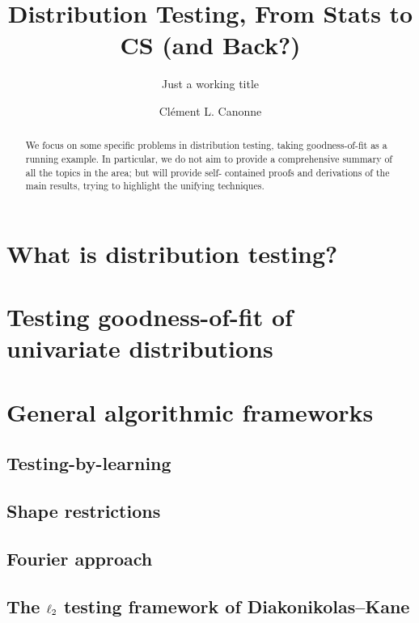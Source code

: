 \documentclass[biber,draft]{nowfnt} %
\title{Distribution Testing, From Stats to CS (and Back?)}
\subtitle{Just a working title}
\author[1]{Cl\'ement L. Canonne}
\affil[1]{University of Sydney; clement.canonne@sydney.edu.au}
\begin{document}
\makeabstracttitle
\begin{abstract}
We focus on some specific problems in distribution testing,
taking goodness-of-fit as a running example. In particular,
we do not aim to provide a comprehensive summary of all
the topics in the area; but will provide self-
contained proofs and derivations of the main results, trying
to highlight the unifying techniques.
\end{abstract}

\chapter{What is distribution testing?}



\chapter{Testing goodness-of-fit of univariate distributions}
  \label{chap:identity}




\chapter{General algorithmic frameworks}
  \label{chap:algorithmic:frameworks}
\section{Testing-by-learning}
\section{Shape restrictions}
\section{Fourier approach}
\section{The $\lp[2]$ testing framework of Diakonikolas--Kane}
\end{document}
